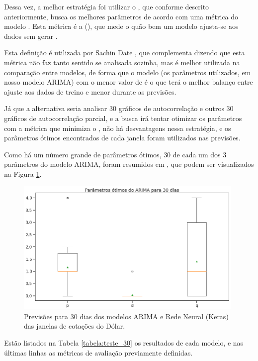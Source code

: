 Dessa vez, a melhor estratégia foi utilizar o , que conforme descrito anteriormente, busca os melhores parâmetros de acordo com uma métrica do modelo . Esta métrica é a  (), que mede o quão bem um modelo ajusta-se aos dados sem gerar .

Esta definição é utilizada por Sachin Date \citep{aic}, que complementa dizendo que esta métrica não faz tanto sentido se analisada sozinha, mas é melhor utilizada na comparação entre modelos, de forma que o modelo (os parâmetros utilizados, em nosso modelo ARIMA) com o menor valor de  é o que terá o melhor balanço entre ajuste aos dados de treino e menor  durante as previsões.

Já que a alternativa seria analisar $30$ gráficos de autocorrelação e outros $30$ gráficos de autocorrelação parcial, e a busca irá tentar otimizar os parâmetros com a métrica que minimiza o , não há desvantagens nessa estratégia, e os parâmetros ótimos encontrados de cada janela foram utilizados nas previsões.

Como há um número grande de parâmetros ótimos, $30$ de cada um dos $3$ parâmetros do modelo ARIMA, foram resumidos em , que podem ser visualizados na Figura \ref{fig:arima_boxplot_30}.

\begin{figure}[htb]
\centering
\includegraphics[width=11cm]{figuras/arima_boxplot_30}
\caption{Previsões para $30$ dias dos modelos ARIMA e Rede Neural (Keras) das janelas de cotações do Dólar.}
\label{fig:arima_boxplot_30}
\end{figure}

Estão listados na Tabela \ref{tabela:teste_30} os resultados de cada modelo, e nas últimas linhas as métricas de avaliação previamente definidas.

